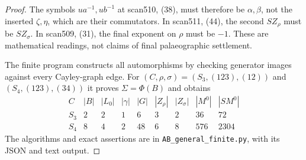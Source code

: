 \begin{proof}
The symbols $ua^{-1},ub^{-1}$ at scan510, (38), must therefore
be $\alpha,\beta$, not the inserted $\zeta,\eta$, which are
their commutators. In scan511, (44), the second $SZ_\rho$ must
be $SZ_\sigma$. In scan509, (31), the final exponent on $\rho$
must be $-1$. These are mathematical readings, not claims of
final palaeographic settlement.

The finite program constructs all automorphisms by checking
generator images against every Cayley-graph edge. For
$(C,\rho,\sigma)=(S_3,(123),(12))$ and
$(S_4,(123),(34))$ it proves $\Sigma=\Phi(B)$ and obtains
\[
\begin{array}{c|rrrrrrrr}
C&|B|&|L_0|&|\gamma|&|G|&|Z_\rho|&|Z_\sigma|&|M^0|&|SM^0|\\\hline
S_3&2&2&1&6&3&2&36&72\\
S_4&8&4&2&48&6&8&576&2304
\end{array}
\]
The algorithms and exact assertions are in
\texttt{AB\_general\_finite.py}, with its JSON and text output.
\end{proof}

